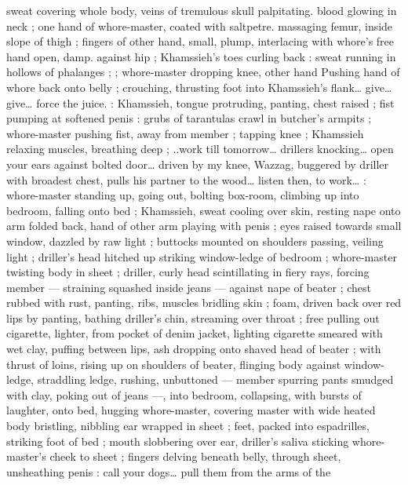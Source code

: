 sweat covering whole body, veins of tremulous skull palpitating. 
blood glowing in neck ; one hand of whore-master, coated with 
saltpetre. massaging femur, inside slope of thigh ; fingers of other 
hand, small, plump, interlacing with whore's free hand open, damp. 
against hip ; Khamssieh's toes curling back : sweat running in 
hollows of phalanges ; ; whore-master dropping knee, other hand 
Pushing hand of whore back onto belly ; crouching, thrusting foot 
into Khamssieh's flank{\ldots} {\gl} give{\ldots} give{\ldots} force the juice. {\gr} : 
Khamssieh, tongue protruding, panting, chest raised ; fist pumping 
at softened penis{\td} : {\gl}{\td} grubs of tarantulas crawl in butcher's 
armpits{\td} {\gr} ; whore-master pushing fist, away from member ; tapping 
knee ; Khamssieh relaxing muscles, breathing deep ; {\gl}..work till 
tomorrow{\ldots} drillers knocking{\ldots} open your ears against bolted door{\ldots} 
driven by my knee, Wazzag, buggered by driller with broadest chest, 
pulls his partner to the wood{\ldots} listen then, to work{\ldots}{\gr} : whore-master 
standing up, going out, bolting box-room, climbing up into bedroom, 
falling onto bed ; Khamssieh, sweat cooling over skin, resting nape 
onto arm folded back, hand of other arm playing with penis ; eyes 
raised towards small window, dazzled by raw light ; buttocks mounted 
on shoulders passing, veiling light ; driller's head hitched up striking 
window-ledge of bedroom ; whore-master twisting body in sheet ; 
driller, curly head scintillating in fiery rays, forcing member --- 
straining squashed inside jeans --- against nape of beater ; chest 
rubbed with rust, panting, ribs, muscles bridling skin ; foam, driven 
back over red lips by panting, bathing driller's chin, streaming over 
throat ; free pulling out cigarette, lighter, from pocket of denim 
jacket, lighting cigarette smeared with wet clay, puffing between lips, 
ash dropping onto shaved head of beater ; with thrust of loins, rising 
up on shoulders of beater, flinging body against window-ledge, 
straddling ledge, rushing, unbuttoned --- member spurring pants 
smudged with clay, poking out of jeans ---, into bedroom, collapsing, 
with bursts of laughter, onto bed, hugging whore-master, covering 
master with wide heated body bristling, nibbling ear wrapped in sheet 
; feet, packed into espadrilles, striking foot of bed ; mouth 
slobbering over ear, driller's saliva sticking whore-master's cheek to 
sheet ; fingers delving beneath belly, through sheet, unsheathing 
penis :{\td} {\gl} call your dogs{\ldots} pull them from the arms of the 
